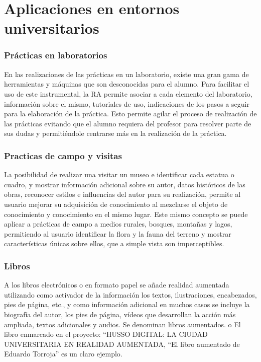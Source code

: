 \section{Aplicaciones en entornos universitarios}

\subsubsection{Prácticas en laboratorios} 
En las realizaciones de las prácticas en un laboratorio, existe una gran gama de herramientas y máquinas que son desconocidas para el alumno. Para facilitar el uso de este instrumental, la RA permite asociar a cada elemento del laboratorio, información sobre el mismo, tutoriales de uso, indicaciones de los pasos a seguir para la elaboración de la práctica. Esto permite agilar el proceso de realización de las prácticas evitando que el alumno requiera del profesor para resolver parte de sus dudas y permitiéndole centrarse más en la realización de la práctica.

\subsubsection{Practicas de campo y visitas} 

La posibilidad de realizar una visitar un museo e identificar cada estatua o cuadro, y mostrar información adicional sobre su autor, datos históricos de las obras, reconocer estilos e influencias del autor para su realización, permite al usuario mejorar su adquisición de conocimiento al mezclarse el objeto de conocimiento y conocimiento en el mismo lugar. Este mismo concepto se puede aplicar a prácticas de campo a medios rurales, bosques, montañas y lagos, permitiendo al usuario identificar la flora y la fauna del terreno y mostrar características únicas sobre ellos, que a simple vista son imperceptibles.
 
\subsubsection{Libros}
A los libros electrónicos o en formato papel se añade realidad aumentada utilizando como activador de la información los textos, ilustraciones, encabezados, pies de página, etc., y como información adicional en muchos casos se incluye la biografía del autor, los pies de página, vídeos que desarrollan la acción más ampliada, textos adicionales y audios. Se denominan libros aumentados.
o El libro enmarcado en el proyecto: “HUSSO DIGITAL: LA CIUDAD UNIVERSITARIA EN REALIDAD AUMENTADA, “El libro aumentado de Eduardo Torroja” es un claro ejemplo.

